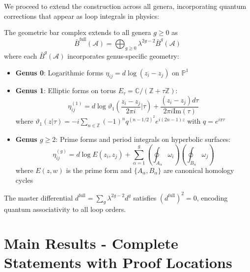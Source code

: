 We proceed to extend the construction across all genera, incorporating quantum corrections that appear as loop integrals in physics:

\begin{theorem}
The geometric bar complex extends to all genera $g \geq 0$ as
$$\bar{B}^{\text{full}}(\mathcal{A}) = \bigoplus_{g \geq 0} \lambda^{2g-2} \bar{B}^g(\mathcal{A})$$
where each $\bar{B}^g(\mathcal{A})$ incorporates genus-specific geometry:
\begin{itemize}
\item \textbf{Genus 0}: Logarithmic forms $\eta_{ij} = d\log(z_i - z_j)$ on $\mathbb{P}^1$
\item \textbf{Genus 1}: Elliptic forms on torus $E_\tau = \mathbb{C}/(\mathbb{Z} + \tau\mathbb{Z})$:
  $$\eta_{ij}^{(1)} = d\log\vartheta_1\left(\frac{z_i - z_j}{2\pi i}|\tau\right) + \frac{(z_i - z_j)d\tau}{2\pi i \text{Im}(\tau)}$$
  where $\vartheta_1(z|\tau) = -i\sum_{n \in \mathbb{Z}}(-1)^n q^{(n-1/2)^2}e^{i(2n-1)z}$ with $q = e^{i\pi\tau}$
\item \textbf{Genus $g \geq 2$}: Prime forms and period integrals on hyperbolic surfaces:
  $$\eta_{ij}^{(g)} = d\log E(z_i, z_j) + \sum_{\alpha=1}^g \left(\oint_{A_\alpha} \omega_i\right) \left(\oint_{B_\alpha} \omega_j\right)$$
  where $E(z,w)$ is the prime form and $\{A_\alpha, B_\alpha\}$ are canonical homology cycles
\end{itemize}
The master differential $d^{\text{full}} = \sum_{g} \lambda^{2g-2} d^g$ satisfies $(d^{\text{full}})^2 = 0$, encoding quantum associativity to all loop orders.
\end{theorem}

\section{Main Results - Complete Statements with Proof Locations}
\label{sec:main-results-complete}

